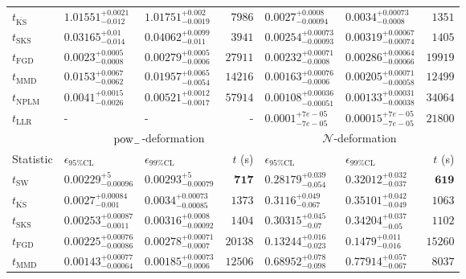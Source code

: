 \begin{tabular}{l|llr|llr}
	$t_{\overline{\mathrm{KS}}}$ & $1.01551_{-0.012}^{+0.0021}$ & $1.01751_{-0.0019}^{+0.002}$ & $7986$ & $0.0027_{-0.00094}^{+0.0008}$ & $0.0034_{-0.0008}^{+0.00073}$ & $1351$ \\
	$t_{\mathrm{SKS}}$ & $0.03165_{-0.014}^{+0.01}$ & $0.04062_{-0.011}^{+0.0099}$ & $3941$ & $0.00254_{-0.00093}^{+0.00073}$ & $0.00319_{-0.00074}^{+0.00067}$ & $1405$ \\
	$t_{\mathrm{FGD}}$ & ${\mathbf{0.0023_{-0.0008}^{+0.0005}}}$ & ${\mathbf{0.00279_{-0.0006}^{+0.0005}}}$ & $27911$ & $0.00232_{-0.0008}^{+0.00071}$ & $0.00286_{-0.00066}^{+0.00064}$ & $19919$ \\
	$t_{\mathrm{MMD}}$ & $0.0153_{-0.0062}^{+0.0067}$ & $0.01957_{-0.0054}^{+0.0065}$ & $14216$ & ${\mathbf{0.00163_{-0.0006}^{+0.00076}}}$ & ${\mathbf{0.00205_{-0.00058}^{+0.00071}}}$ & $12499$ \\
\rowcolor{red!35}	$t_{\mathrm{NPLM}}$ & $0.0041_{-0.0026}^{+0.0015}$ & $0.00521_{-0.0017}^{+0.0012}$ & $57914$ & $0.00108_{-0.00051}^{+0.00036}$ & $0.00133_{-0.00038}^{+0.00031}$ & $34064$ \\
	$t_{\mathrm{LLR}}$ & - & - & - & $0.0001_{-7e-05}^{+7e-05}$ & $0.00015_{-7e-05}^{+7e-05}$ & $21800$ \\
	\toprule
	\multicolumn{1}{c}{} & \multicolumn{3}{c}{$\rm{pow}_{-}$-deformation} & \multicolumn{3}{c}{$\mathcal{N}$-deformation} \\
	Statistic & $\epsilon_{95\%\mathrm{CL}}$ & $\epsilon_{99\%\mathrm{CL}}$ & $t$ (s) & $\epsilon_{95\%\mathrm{CL}}$ & $\epsilon_{99\%\mathrm{CL}}$ & $t$ (s) \\
	\midrule
	$t_{\mathrm{SW}}$ & $0.00229_{-0.00096}^{+5}$ & $0.00293_{-0.00079}^{+5}$ & ${\mathbf{717}}$ & $0.28179_{-0.054}^{+0.039}$ & $0.32012_{-0.037}^{+0.032}$ & ${\mathbf{619}}$ \\
	$t_{\overline{\mathrm{KS}}}$ & $0.0027_{-0.001}^{+0.00084}$ & $0.0034_{-0.00085}^{+0.00073}$ & $1373$ & $0.3116_{-0.067}^{+0.049}$ & $0.35101_{-0.049}^{+0.042}$ & $1063$ \\
	$t_{\mathrm{SKS}}$ & $0.00253_{-0.0011}^{+0.00087}$ & $0.00316_{-0.00092}^{+0.0008}$ & $1404$ & $0.30315_{-0.07}^{+0.045}$ & $0.34204_{-0.05}^{+0.037}$ & $1102$ \\
	$t_{\mathrm{FGD}}$ & $0.00225_{-0.00086}^{+0.00076}$ & $0.00278_{-0.0007}^{+0.00071}$ & $20138$ & ${\mathbf{0.13244_{-0.023}^{+0.016}}}$ & ${\mathbf{0.1479_{-0.016}^{+0.011}}}$ & $15260$ \\
	$t_{\mathrm{MMD}}$ & ${\mathbf{0.00143_{-0.00064}^{+0.00077}}}$ & ${\mathbf{0.00185_{-0.0006}^{+0.00073}}}$ & $12506$ & $0.68952_{-0.098}^{+0.078}$ & $0.77914_{-0.067}^{+0.057}$ & $8037$ \\

\end{tabular}
